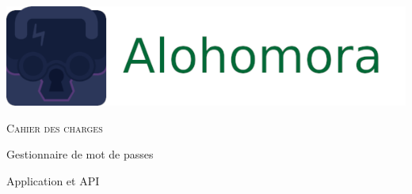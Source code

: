 \documentclass[oneside]{report}
\author{Sylvain COMBRAQUE, Sarah LAMOTTE, Nathan JANCZEWSKI, Léo BERGEROT}
\begin{document}
	\begin{titlepage}
		\centering
		\includegraphics[scale=.5]{logo_large}
		\vspace{5cm}
		{\par\scshape\Huge Cahier des charges\par}
		\vspace{5cm}
		{\par Gestionnaire de mot de passes\par}
		{\par Application et API\par}
		\vfill
	\end{titlepage}

	\pagestyle{fancy}
	\fancyhf{}
	\tableofcontents
\end{document}
